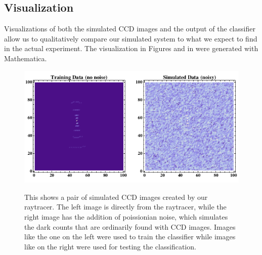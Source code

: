 \subsection{Visualization}

Visualizations of both the simulated CCD images and the output of the classifier allow us to qualitatively compare our simulated system to what we expect to find in the actual experiment. The visualization in Figures \label{ccd2d} and \label{contours}  in were generated with Mathematica.

\begin{figure}
  \centering
  \includegraphics[scale=0.7]{ccd2d.png}
  \label{ccd2d}
  \caption{This shows a pair of simulated CCD images created by our raytracer. The left image is directly from the raytracer, while the right image has the addition of poissionian noise, which simulates the dark counts that are ordinarily found with CCD images. Images like the one on the left were used to train the classifier while images like on the right were used for testing the classification.}
\end{figure}

